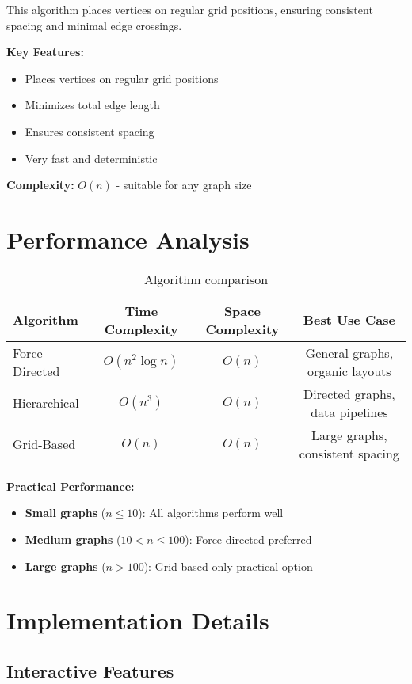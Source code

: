\documentclass[11pt]{article}
\begin{document}
This algorithm places vertices on regular grid positions, ensuring consistent spacing and minimal edge crossings.

\textbf{Key Features:}
\begin{itemize}
\item Places vertices on regular grid positions
\item Minimizes total edge length
\item Ensures consistent spacing
\item Very fast and deterministic
\end{itemize}

\textbf{Complexity:} $O(n)$ - suitable for any graph size

\section{Performance Analysis}

\begin{table}[h]
\centering
\begin{tabular}{|l|c|c|c|}
\hline
Algorithm & Time Complexity & Space Complexity & Best Use Case \\
\hline
Force-Directed & $O(n^2 \log n)$ & $O(n)$ & General graphs, organic layouts \\
Hierarchical & $O(n^3)$ & $O(n)$ & Directed graphs, data pipelines \\
Grid-Based & $O(n)$ & $O(n)$ & Large graphs, consistent spacing \\
\hline
\end{tabular}
\caption{Algorithm comparison}
\end{table}

\textbf{Practical Performance:}
\begin{itemize}
\item \textbf{Small graphs} ($n \leq 10$): All algorithms perform well
\item \textbf{Medium graphs} ($10 < n \leq 100$): Force-directed preferred
\item \textbf{Large graphs} ($n > 100$): Grid-based only practical option
\end{itemize}

\section{Implementation Details}

\subsection{Interactive Features}
\end{document}
